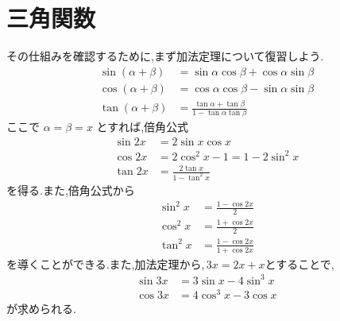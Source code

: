 \section{三角関数}
  その仕組みを確認するために,まず加法定理について復習しよう.
  \begin{align*}
    \sin(\alpha+\beta)
      &=\sin\alpha\cos\beta+\cos\alpha\sin\beta\\
    \cos(\alpha+\beta)
      &=\cos\alpha\cos\beta-\sin\alpha\sin\beta\\
    \tan(\alpha+\beta)
      &=\frac{\tan\alpha+\tan\beta}
              {1-\tan\alpha\tan\beta}
  \end{align*}
  ここで $\alpha=\beta=x$ とすれば,倍角公式
  \begin{align*}
    \sin 2x&=2\sin x\cos x\\
    \cos 2x&=2\cos^2x-1=1-2\sin^2x\\
    \tan 2x&=\frac{2\tan x}{1-\tan^2x}
  \end{align*}
  を得る.また,倍角公式から
  \begin{align*}
    \sin^2x&=\frac{1-\cos 2x}{2}\\
    \cos^2x&=\frac{1+\cos 2x}{2}\\
    \tan^2x&=\frac{1-\cos 2x}{1+\cos 2x}
  \end{align*}
  を導くことができる.また,加法定理から,\,$3x=2x+x$とすることで,
  \begin{align*}
    \sin 3x&=3\sin x-4\sin^3x\\
    \cos 3x&=4\cos^3x-3\cos x
  \end{align*}
  が求められる.